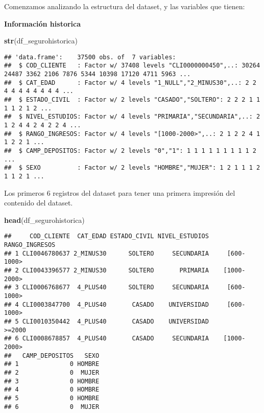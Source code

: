 \documentclass[]{article}
\newenvironment{Shaded}{\begin{snugshade}}{\end{snugshade}}
\newcommand{\KeywordTok}[1]{\textcolor[rgb]{0.13,0.29,0.53}{\textbf{#1}}}
\newcommand{\NormalTok}[1]{#1}
\begin{document}
Comenzamos analizando la estructura del dataset, y las variables que
tienen:

\textbf{Información historica}

\begin{Shaded}
\begin{Highlighting}[]
\KeywordTok{str}\NormalTok{(df_segurohistorica)}
\end{Highlighting}
\end{Shaded}

\begin{verbatim}
## 'data.frame':    37500 obs. of  7 variables:
##  $ COD_CLIENTE   : Factor w/ 37408 levels "CLI0000000450",..: 30264 24487 3362 2106 7876 5344 10398 17120 4711 5963 ...
##  $ CAT_EDAD      : Factor w/ 4 levels "1_NULL","2_MINUS30",..: 2 2 4 4 4 4 4 4 4 4 ...
##  $ ESTADO_CIVIL  : Factor w/ 2 levels "CASADO","SOLTERO": 2 2 2 1 1 1 1 2 1 2 ...
##  $ NIVEL_ESTUDIOS: Factor w/ 4 levels "PRIMARIA","SECUNDARIA",..: 2 1 2 4 4 2 4 2 2 4 ...
##  $ RANGO_INGRESOS: Factor w/ 4 levels "[1000-2000>",..: 2 1 2 2 4 1 1 2 2 1 ...
##  $ CAMP_DEPOSITOS: Factor w/ 2 levels "0","1": 1 1 1 1 1 1 1 1 1 2 ...
##  $ SEXO          : Factor w/ 2 levels "HOMBRE","MUJER": 1 2 1 1 1 2 1 1 2 1 ...
\end{verbatim}

Los primeros 6 registros del dataset para tener una primera impresión
del contenido del dataset.

\begin{Shaded}
\begin{Highlighting}[]
\KeywordTok{head}\NormalTok{(df_segurohistorica)}
\end{Highlighting}
\end{Shaded}

\begin{verbatim}
##     COD_CLIENTE  CAT_EDAD ESTADO_CIVIL NIVEL_ESTUDIOS RANGO_INGRESOS
## 1 CLI0046780637 2_MINUS30      SOLTERO     SECUNDARIA     [600-1000>
## 2 CLI0043396577 2_MINUS30      SOLTERO       PRIMARIA    [1000-2000>
## 3 CLI0006768677  4_PLUS40      SOLTERO     SECUNDARIA     [600-1000>
## 4 CLI0003847700  4_PLUS40       CASADO    UNIVERSIDAD     [600-1000>
## 5 CLI0010350442  4_PLUS40       CASADO    UNIVERSIDAD         >=2000
## 6 CLI0008678857  4_PLUS40       CASADO     SECUNDARIA    [1000-2000>
##   CAMP_DEPOSITOS   SEXO
## 1              0 HOMBRE
## 2              0  MUJER
## 3              0 HOMBRE
## 4              0 HOMBRE
## 5              0 HOMBRE
## 6              0  MUJER
\end{verbatim}
\end{document}
